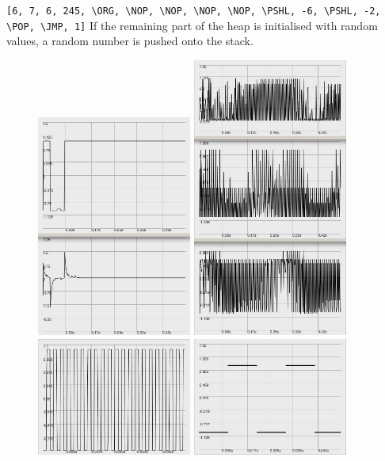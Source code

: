 \documentclass[letterpaper, 12pt]{article}
\begin{document}
\verb#[6, 7, 6, 245, \ORG, \NOP, \NOP, \NOP, \NOP, \PSHL, -6, \PSHL, -2, \POP, \JMP, 1]#
If the remaining part of the heap is initialised with random values, a random number is pushed onto the stack.

\begin{figure}
	\centering
		\includegraphics[width=2in]{wv-POPdestroy-noRandom}
		\includegraphics[width=2in]{wv-POPdestroy-random}
		\includegraphics[width=2in]{wv-impulse}
		\includegraphics[width=2in]{wv-pulse202}

\end{figure}
\end{document}
